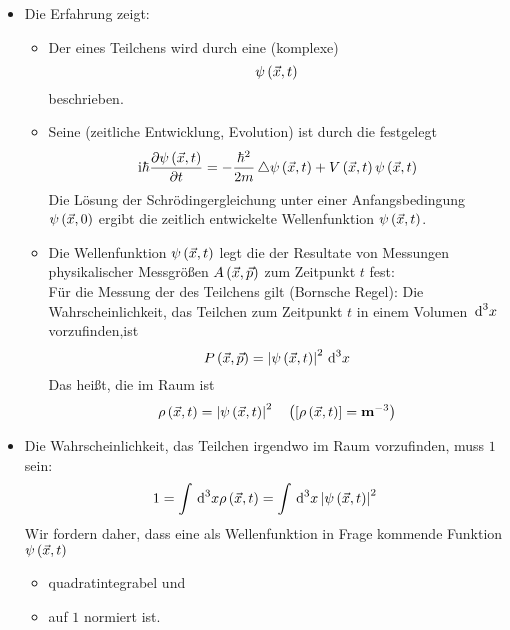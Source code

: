 \begin{itemize}
  \item Die Erfahrung zeigt:
  \begin{itemize}
    \item Der  eines Teilchens wird durch eine (komplexe) 
    \begin{equation}
      \psi\of{\vX,t}
    \end{equation}
    beschrieben.
    \item Seine  (zeitliche Entwicklung, Evolution) ist durch die  festgelegt
    \begin{equation}
      \mI \hbar \ppv{\psi\of{\vX,t}}{t} = - \frac{\hbar^2}{2 m} \Laplace \psi\of{\vX,t} + V\of{\vX,t}\psi\of{\vX,t}
    \end{equation}
    Die Lösung der Schrödingergleichung unter einer Anfangsbedingung $\psi\of{\vX,0}$ ergibt die zeitlich entwickelte Wellenfunktion $\psi\of{\vX,t}$.
    \item Die Wellenfunktion $\psi\of{\vX,t}$ legt die  der Resultate von Messungen physikalischer Messgrößen $A\of{\vX,\vP}$ zum Zeitpunkt $t$ fest:\\
    Für die Messung der  des Teilchens gilt (Bornsche Regel): Die Wahrscheinlichkeit, das Teilchen zum Zeitpunkt $t$ in einem Volumen $\dn{x}{3}$ vorzufinden,ist
    \begin{equation}
      P\of{\vX,\vP} = \Norm{\psi\of{\vX,t}}^2 \dn{x}{3}
    \end{equation}
    Das heißt, die  im Raum ist
    \begin{equation}
      \rho\of{\vX,t} = \Norm{\psi\of{\vX,t}}^2 \quad \norBra{\Unit{\rho\of{\vX,t}} = \mtr^{-3}}
    \end{equation}
  \end{itemize}
  \item Die Wahrscheinlichkeit, das Teilchen irgendwo im Raum vorzufinden, muss $1$ sein:
  \begin{equation}
    1 = \int \dn{x}{3} \rho\of{\vX,t} = \int \dn{x}{3} \Norm{\psi\of{\vX,t}}^2
  \end{equation}
  Wir fordern daher, dass eine als Wellenfunktion in Frage kommende Funktion $\psi\of{\vX,t}$
  \begin{itemize}
    \item quadratintegrabel und
    \item auf $1$ normiert ist.
  \end{itemize}

\end{itemize}
